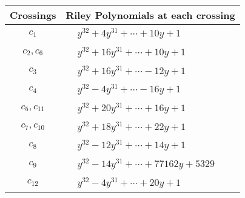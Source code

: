 \documentclass[1p]{elsarticle_modified}
\theoremstyle{definition}
\begin{document}
\begin{tabular}{m{50pt}|m{274pt}}
Crossings & \hspace{64pt}Riley Polynomials at each crossing \\
\hline $$\begin{aligned}c_{1}\end{aligned}$$&$\begin{aligned}
&y^{32}+4 y^{31}+\cdots+10 y+1
\end{aligned}$\\
\hline $$\begin{aligned}c_{2},c_{6}\end{aligned}$$&$\begin{aligned}
&y^{32}+16 y^{31}+\cdots+10 y+1
\end{aligned}$\\
\hline $$\begin{aligned}c_{3}\end{aligned}$$&$\begin{aligned}
&y^{32}+16 y^{31}+\cdots-12 y+1
\end{aligned}$\\
\hline $$\begin{aligned}c_{4}\end{aligned}$$&$\begin{aligned}
&y^{32}-4 y^{31}+\cdots-16 y+1
\end{aligned}$\\
\hline $$\begin{aligned}c_{5},c_{11}\end{aligned}$$&$\begin{aligned}
&y^{32}+20 y^{31}+\cdots+16 y+1
\end{aligned}$\\
\hline $$\begin{aligned}c_{7},c_{10}\end{aligned}$$&$\begin{aligned}
&y^{32}+18 y^{31}+\cdots+22 y+1
\end{aligned}$\\
\hline $$\begin{aligned}c_{8}\end{aligned}$$&$\begin{aligned}
&y^{32}-12 y^{31}+\cdots+14 y+1
\end{aligned}$\\
\hline $$\begin{aligned}c_{9}\end{aligned}$$&$\begin{aligned}
&y^{32}-14 y^{31}+\cdots+77162 y+5329
\end{aligned}$\\
\hline $$\begin{aligned}c_{12}\end{aligned}$$&$\begin{aligned}
&y^{32}-4 y^{31}+\cdots+20 y+1
\end{aligned}$\\
\hline
\end{tabular}\\~\\
\end{document}
